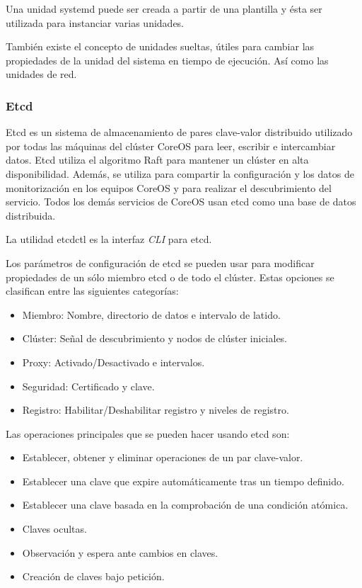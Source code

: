 Una unidad systemd puede ser creada a partir de una plantilla y ésta ser utilizada para instanciar varias unidades.

También existe el concepto de unidades sueltas, útiles para cambiar las propiedades de la unidad del sistema en tiempo de ejecución. Así como las unidades de red.

\subsubsection{Etcd}

Etcd es un sistema de almacenamiento de pares clave-valor distribuido utilizado por todas las máquinas del clúster CoreOS para leer, escribir e intercambiar datos. Etcd utiliza el algoritmo Raft para mantener un clúster en alta disponibilidad. Además, se utiliza para compartir la configuración y los datos de monitorización en los equipos CoreOS y para realizar el descubrimiento del servicio. Todos los demás servicios de CoreOS usan etcd como una base de datos distribuida. 

La utilidad etcdctl es la interfaz \textit{CLI} para etcd.

Los parámetros de configuración de etcd se pueden usar para modificar propiedades de un sólo miembro etcd o de todo el clúster. Estas opciones se clasifican entre las siguientes categorías:

\begin{itemize}
\item Miembro: Nombre, directorio de datos e intervalo de latido.
\item Clúster: Señal de descubrimiento y nodos de clúster iniciales.
\item Proxy: Activado/Desactivado e intervalos.
\item Seguridad: Certificado y clave.
\item Registro: Habilitar/Deshabilitar registro y niveles de registro.
\end{itemize}

Las operaciones principales que se pueden hacer usando etcd son:

\begin{itemize}
\item Establecer, obtener y eliminar operaciones de un par clave-valor.
\item Establecer una clave que expire automáticamente tras un tiempo definido. 
\item Establecer una clave basada en la comprobación de una condición atómica.
\item Claves ocultas.
\item Observación y espera ante cambios en claves.
\item Creación de claves bajo petición.
\end{itemize}

